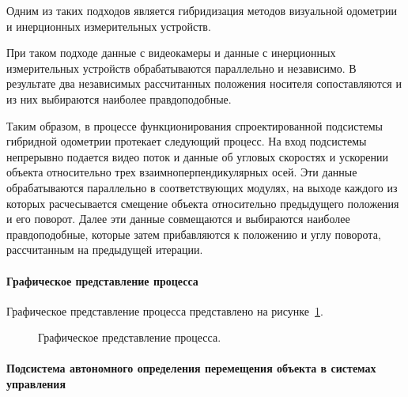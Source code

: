 Одним из таких подходов является гибридизация методов визуальной одометрии и инерционных измерительных устройств.

При таком подходе данные с видеокамеры и данные с инерционных измерительных устройств обрабатываются параллельно и независимо. В результате два независимых рассчитанных положения носителя сопоставляются и из них выбираются наиболее правдоподобные.

Таким образом, в процессе функционирования спроектированной подсистемы гибридной одометрии протекает следующий процесс. 
На вход подсистемы непрерывно подается видео поток и данные об угловых скоростях и ускорении объекта относительно трех взаимноперпендикулярных осей. Эти данные обрабатываются параллельно в соответствующих модулях, на выходе каждого из которых расчесывается смещение объекта относительно предыдущего положения и его поворот. Далее эти данные совмещаются и выбираются наиболее правдоподобные, которые затем прибавляются к положению и углу поворота, рассчитанным на предыдущей итерации. 


\paragraph{Графическое представление процесса}
Графическое представление процесса представлено на рисунке~\ref{pic:predmetOblast}.

\begin{figure}[!h]
\caption{Графическое представление процесса.}
\label{pic:predmetOblast}
\end{figure}

\paragraph{Подсистема автономного определения перемещения объекта в системах управления}

